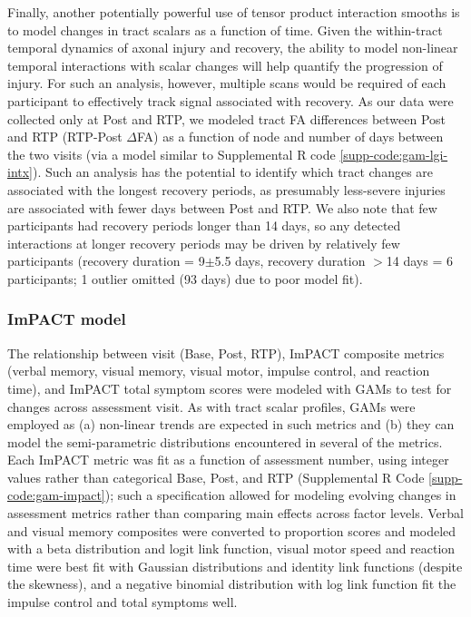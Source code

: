 \documentclass[12pt]{article}
\begin{document}
Finally, another potentially powerful use of tensor product interaction smooths is to model changes in tract scalars as a function of time. Given the within-tract temporal dynamics of axonal injury and recovery, the ability to model non-linear temporal interactions with scalar changes will help quantify the progression of injury. For such an analysis, however, multiple scans would be required of each participant to effectively track signal associated with recovery. As our data were collected only at Post and RTP, we modeled tract FA differences between Post and RTP (RTP-Post $\Delta$FA) as a function of node and number of days between the two visits (via a model similar to Supplemental R code \ref{supp-code:gam-lgi-intx}). Such an analysis has the potential to identify which tract changes are associated with the longest recovery periods, as presumably less-severe injuries are associated with fewer days between Post and RTP. We also note that few participants had recovery periods longer than 14 days, so any detected interactions at longer recovery periods may be driven by relatively few participants (recovery duration = 9$\pm$5.5 days, recovery duration $>$14 days = 6 participants; 1 outlier omitted (93 days) due to poor model fit).

\subsubsection{ImPACT model}
\label{sssec:meth-gam-impact}
The relationship between visit (Base, Post, RTP), ImPACT composite metrics (verbal memory, visual memory, visual motor, impulse control, and reaction time), and ImPACT total symptom scores were modeled with GAMs to test for changes across assessment visit. As with tract scalar profiles, GAMs were employed as (a) non-linear trends are expected in such metrics and (b) they can model the semi-parametric distributions encountered in several of the metrics. Each ImPACT metric was fit as a function of assessment number, using integer values rather than categorical Base, Post, and RTP (Supplemental R Code \ref{supp-code:gam-impact}); such a specification allowed for modeling evolving changes in assessment metrics rather than comparing main effects across factor levels. Verbal and visual memory composites were converted to proportion scores and modeled with a beta distribution and logit link function, visual motor speed and reaction time were best fit with Gaussian distributions and identity link functions (despite the skewness), and a negative binomial distribution with log link function fit the impulse control and total symptoms well.
\end{document}
